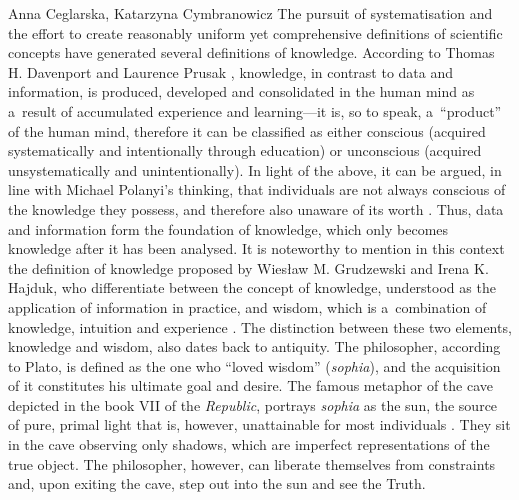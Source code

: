 \begin{artengenv2auth}{Anna Ceglarska, Katarzyna Cymbranowicz}
The pursuit of systematisation and the effort to create reasonably uniform yet comprehensive definitions of scientific concepts have generated several definitions of knowledge. According to Thomas H. Davenport and Laurence Prusak 
\parencite*[][]{davenport_working_1998}, %
 knowledge, in contrast to data and information, is produced, developed and consolidated in the human mind as a~result of accumulated experience and learning---it is, so to speak, a~``product'' of the human mind, therefore it can be classified as either conscious (acquired systematically and intentionally through education) or unconscious (acquired unsystematically and unintentionally). In light of the above, it can be argued, in line with Michael Polanyi's thinking, that individuals are not always conscious of the knowledge they possess, and therefore also unaware of its worth 
\parencite[][p.37]{polanyi_tacit_1966}. %
 Thus, data and information form the foundation of knowledge, which only becomes knowledge after it has been analysed. It is noteworthy to mention in this context the definition of knowledge proposed by Wiesław M. Grudzewski and Irena K. Hajduk, who differentiate between the concept of knowledge, understood as the application of information in practice, and wisdom, which is a~combination of knowledge, intuition and experience 
\parencite[][p.73]{grudzewski_zarzadzanie_2004}. %
 The distinction between these two elements, knowledge and wisdom, also dates back to antiquity. The philosopher, according to Plato, is defined as the one who ``loved wisdom'' (\textit{sophia}), and the acquisition of it constitutes his ultimate goal and desire. The famous metaphor of the cave depicted in the book VII of the \textit{Republic}, portrays \textit{sophia} as the sun, the source of pure, primal light that is, however, unattainable for most individuals 
\parencite[][VII, 514-516]{plato_plato_1969}. %
 They sit in the cave observing only shadows, which are imperfect representations of the true object. The philosopher, however, can liberate themselves from constraints and, upon exiting the cave, step out into the sun and see the Truth.




\end{artengenv2auth}

